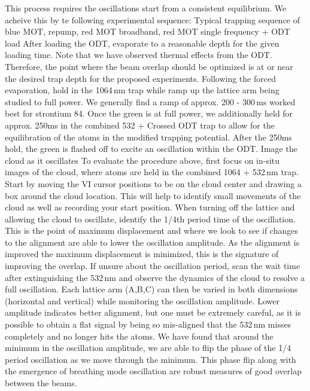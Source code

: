 \begin{outline}[enumerate]
\1 This process requires the oscillations start from a consistent equilibrium.
We acheive this by te following experimental sequence:
	\2 Typical trapping sequence of blue MOT, repump, red MOT broadband, red MOT single frequency + ODT load
	\2 After loading the ODT, evaporate to a reasonable depth for the given loading time.
	Note that we have observed thermal effects from the ODT.
	Therefore, the point where the beam overlap should be optimized is at or near the desired trap depth for the proposed experiments.
	\2 Following the forced evaporation, hold in the 1064\,nm trap while ramp up the lattice arm being studied to full power.
	We generally find a ramp of approx. 200 - 300\,ms worked best for strontium 84. 
	\2 Once the green is at full power, we additionally held for approx. 250ms in the combined 532 + Crossed ODT trap to allow for the equilibration of the atoms in the modified trapping potential.
	\2 After the 250ms hold, the green is flashed off to excite an oscillation within the ODT.
	\2 Image the cloud as it oscillates
\1 To evaluate the procedure above, first focus on in-situ images of the cloud, where atoms are held in the combined 1064 + 532\,nm trap.
Start by moving the VI cursor positions to be on the cloud center and drawing a box around the cloud location.
This will help to identify small movements of the cloud as well as recording your start position.  
\1 When turning off the lattice and allowing the cloud to oscillate, identify the 1/4th period time of the oscillation. 
This is the point of maximum displacement and where we look to see if changes to the alignment are able to lower the oscillation amplitude.
As the alignment is improved the maximum displacement is minimized, this is the signature of improving the overlap.
If unsure about the oscillation period, scan the wait time after extinguishing the 532\,nm and observe the dynamics of the cloud to resolve a full oscillation.
\1 Each lattice arm (A,B,C) can then be varied in both dimensions (horizontal and vertical) while monitoring the oscillation amplitude. 
Lower amplitude indicates better alignment, but one must be extremely careful, as it is possible to obtain a flat signal by being so mis-aligned that the 532\,nm misses completely and no longer hits the atoms.
We have found that around the minimum in the oscillation amplitude, we are able to flip the phase of the 1/4 period oscillation as we move through the minimum.
This phase flip along with the emergence of breathing mode oscillation are robust measures of good overlap between the beams.
\end{outline}

